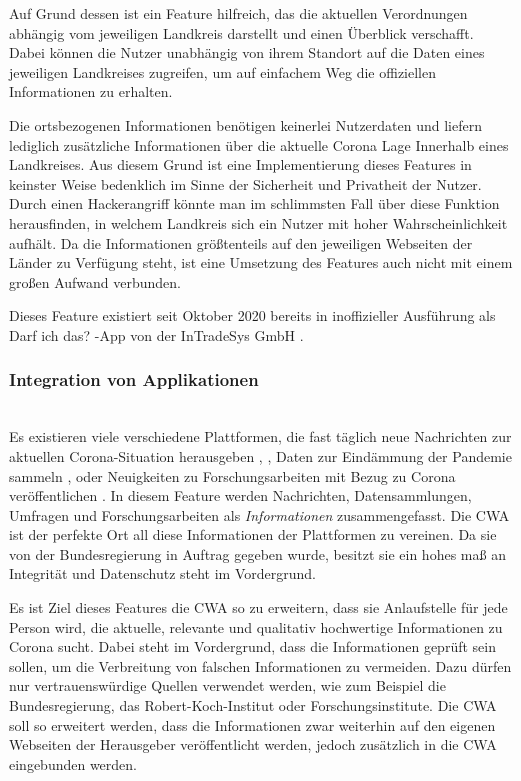 \documentclass[conference,compsoc]{IEEEtran}
\begin{document}
Auf Grund dessen ist ein Feature hilfreich, das die aktuellen Verordnungen abhängig vom jeweiligen Landkreis darstellt und einen Überblick verschafft.
Dabei können die Nutzer unabhängig von ihrem Standort auf die Daten eines jeweiligen Landkreises zugreifen,
um auf einfachem Weg die offiziellen Informationen zu erhalten. 

Die ortsbezogenen Informationen benötigen keinerlei Nutzerdaten und liefern lediglich zusätzliche Informationen über die aktuelle Corona Lage Innerhalb eines Landkreises.
Aus diesem Grund ist eine Implementierung dieses Features in keinster Weise bedenklich im Sinne der Sicherheit und Privatheit der Nutzer.
Durch einen Hackerangriff könnte man im schlimmsten Fall über diese Funktion herausfinden, in welchem Landkreis sich ein Nutzer mit hoher Wahrscheinlichkeit aufhält.
Da die Informationen größtenteils auf den jeweiligen Webseiten der Länder zu Verfügung steht, ist eine Umsetzung des Features auch nicht mit einem großen Aufwand verbunden.  

Dieses Feature existiert seit Oktober 2020 bereits in inoffizieller Ausführung als \glqq Darf ich das?\grqq{} -App von der InTradeSys GmbH \cite{DarfIchDas}.\\

\subsubsection{Integration von Applikationen}
\text{}\\
Es existieren viele verschiedene Plattformen, die fast täglich neue Nachrichten zur aktuellen Corona-Situation herausgeben \cite{RKI}, \cite{BMG}, Daten zur Eindämmung der Pandemie sammeln \cite{RKIDatenspende}, \cite{Gedaechtnistest} oder Neuigkeiten zu Forschungsarbeiten mit Bezug zu Corona veröffentlichen \cite{GesundheitsforschungNews}.
In diesem Feature werden Nachrichten, Datensammlungen, Umfragen und Forschungsarbeiten als \textit{Informationen} zusammengefasst.
Die CWA ist der perfekte Ort all diese Informationen der Plattformen zu vereinen. 
Da sie von der Bundesregierung in Auftrag gegeben wurde, besitzt sie ein hohes maß an Integrität und Datenschutz steht im Vordergrund.

Es ist Ziel dieses Features die CWA so zu erweitern, dass sie Anlaufstelle für jede Person wird, die aktuelle, relevante und qualitativ hochwertige Informationen zu Corona sucht.
Dabei steht im Vordergrund, dass die Informationen geprüft sein sollen, um die Verbreitung von falschen Informationen zu vermeiden. 
Dazu dürfen nur vertrauenswürdige Quellen verwendet werden, wie zum Beispiel die Bundesregierung, das Robert-Koch-Institut oder Forschungsinstitute. 
Die CWA soll so erweitert werden, dass die Informationen zwar weiterhin auf den eigenen Webseiten der Herausgeber veröffentlicht werden, jedoch zusätzlich in die CWA eingebunden werden.
\end{document}
